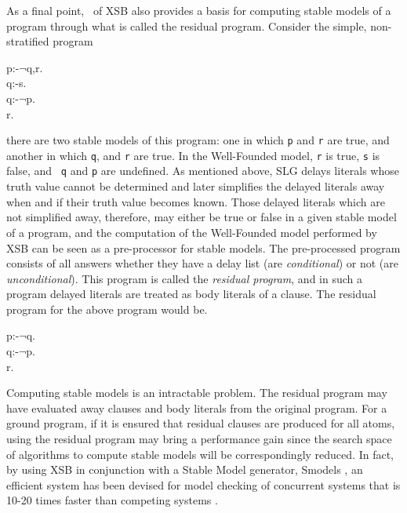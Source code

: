 As a final point, \version\ of XSB also provides a basis for computing
stable models of a program through what is called the residual
program. Consider the simple, non-stratified program 
\begin{center}
\begin{Prog}
p:-$\neg$q,r. \\
q:-s. \\
q:-$\neg$p. \\
r. \\
\end{Prog}
\end{center}
there are two stable models of this program: one in which {\tt p} and
{\tt r} are true, and another in which {\tt q}, and {\tt r} are true.
In the Well-Founded model, {\tt r} is true, {\tt s} is false, and {\tt
q} and {\tt p} are undefined.  As mentioned above, SLG delays literals
whose truth value cannot be determined and later simplifies the
delayed literals away when and if their truth value becomes known.
Those delayed literals which are not simplified away, therefore, may
either be true or false in a given stable model of a program, and the
computation of the Well-Founded model performed by XSB can be seen as
a pre-processor for stable models.  The pre-processed program consists
of all answers whether they have a delay list (are {\em conditional})
or not (are {\em unconditional}).  This program is called the {\em
residual program}, and in such a program delayed literals are treated
as body literals of a clause.  The residual program for the above
program would be. 
\begin{center}
\begin{Prog}
p:-$\neg$q. \\
q:-$\neg$p. \\
r. \\
\end{Prog}
\end{center}
Computing stable models is an intractable problem.  The residual
program may have evaluated away clauses and body literals from the
original program.  For a ground program, if it is ensured that
residual clauses are produced for all atoms, using the residual
program may bring a performance gain since the search space of
algorithms to compute stable models will be correspondingly reduced.
In fact, by using XSB in conjunction with a Stable Model generator,
Smodels \cite{NiSi96}, an efficient system has been devised for model
checking of concurrent systems that is 10-20 times faster than
competing systems \cite{RaSm97}.


